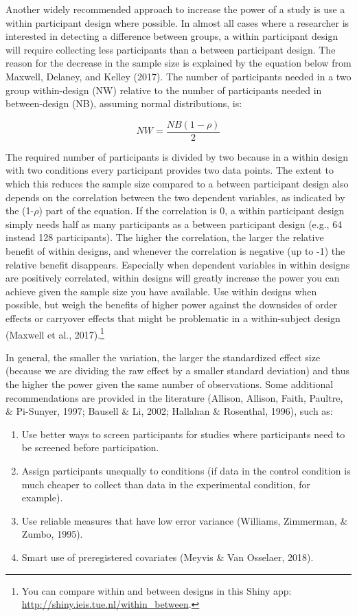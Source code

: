 \documentclass[
  english,
  ,jou, a4paper,floatsintext]{apa6}
\providecommand{\tightlist}{%
  \setlength{\itemsep}{0pt}\setlength{\parskip}{0pt}}
\begin{document}
Another widely recommended approach to increase the power of a study is use a within participant design where possible. In almost all cases where a researcher is interested in detecting a difference between groups, a within participant design will require collecting less participants than a between participant design. The reason for the decrease in the sample size is explained by the equation below from Maxwell, Delaney, and Kelley (2017). The number of participants needed in a two group within-design (NW) relative to the number of participants needed in between-design (NB), assuming normal distributions, is:

\[NW = \frac{NB (1-\rho)}{2}\]

The required number of participants is divided by two because in a within design with two conditions every participant provides two data points. The extent to which this reduces the sample size compared to a between participant design also depends on the correlation between the two dependent variables, as indicated by the (1-\(\rho\)) part of the equation. If the correlation is 0, a within participant design simply needs half as many participants as a between participant design (e.g., 64 instead 128 participants). The higher the correlation, the larger the relative benefit of within designs, and whenever the correlation is negative (up to -1) the relative benefit disappears. Especially when dependent variables in within designs are positively correlated, within designs will greatly increase the power you can achieve given the sample size you have available. Use within designs when possible, but weigh the benefits of higher power against the downsides of order effects or carryover effects that might be problematic in a within-subject design (Maxwell et al., 2017).\footnote{You can compare within and between designs in this Shiny app: \url{http://shiny.ieis.tue.nl/within_between}.}

In general, the smaller the variation, the larger the standardized effect size (because we are dividing the raw effect by a smaller standard deviation) and thus the higher the power given the same number of observations. Some additional recommendations are provided in the literature (Allison, Allison, Faith, Paultre, \& Pi-Sunyer, 1997; Bausell \& Li, 2002; Hallahan \& Rosenthal, 1996), such as:

\begin{enumerate}
\def\labelenumi{\arabic{enumi}.}
\tightlist
\item
  Use better ways to screen participants for studies where participants need to be screened before participation.
\item
  Assign participants unequally to conditions (if data in the control condition is much cheaper to collect than data in the experimental condition, for example).
\item
  Use reliable measures that have low error variance (Williams, Zimmerman, \& Zumbo, 1995).
\item
  Smart use of preregistered covariates (Meyvis \& Van Osselaer, 2018).
\end{enumerate}
\end{document}
